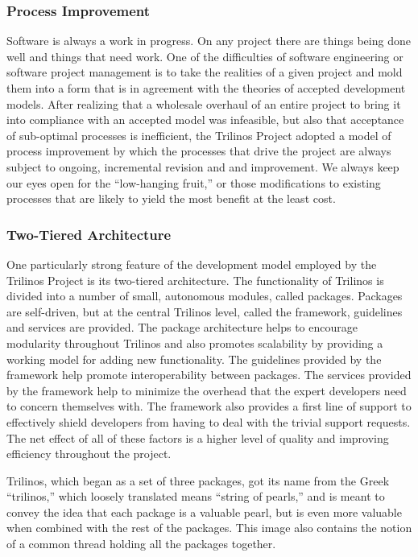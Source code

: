 \documentclass[12pt,relax]{article}
\begin{document}
  \subsubsection{Process Improvement}
  
  Software is always a work in progress.  On any project there are things
  being done well and things that need work.  One of the difficulties of 
  software engineering or software project management is to take the realities
  of a given project and mold them into a form that is in agreement with the
  theories of accepted development models.  After realizing that a wholesale 
  overhaul of an entire project to bring it into compliance with an accepted
  model was infeasible, but also that acceptance of sub-optimal processes is
  inefficient, the Trilinos Project adopted a model of process improvement by
  which the processes that drive the project are always subject to ongoing,
  incremental revision and and improvement.  We always keep our eyes open for the 
  ``low-hanging fruit,'' or those modifications to existing processes that are
  likely to yield the most benefit at the least cost.  
  
  \subsubsection{Two-Tiered Architecture}
  
  One particularly strong feature of the development model employed by the
  Trilinos Project is its two-tiered architecture.  The functionality of Trilinos
  is divided into a number of small, autonomous modules, called packages. 
  Packages are self-driven, but at the central Trilinos level, called the
  framework, guidelines and services are provided.  The package architecture
  helps to encourage modularity throughout Trilinos and also promotes scalability
  by providing a working model for adding new functionality.  The guidelines
  provided by the framework help promote interoperability between packages.
  The services provided by the framework help to minimize the overhead that the
  expert developers need to concern themselves with.  The framework also provides
  a first line of support to effectively shield developers from having to deal
  with the trivial support requests.  The net effect of all of these factors is
  a higher level of quality and improving efficiency throughout the project.
  
  Trilinos, which began as a set of three packages, got its name from the Greek
  ``trilinos,'' which loosely translated means ``string of pearls,'' and is
  meant to convey the idea that each package is a valuable pearl, but is even
  more valuable when combined with the rest of the packages.  This image also
  contains the notion of a common thread holding all the packages together.
  
\end{document}
